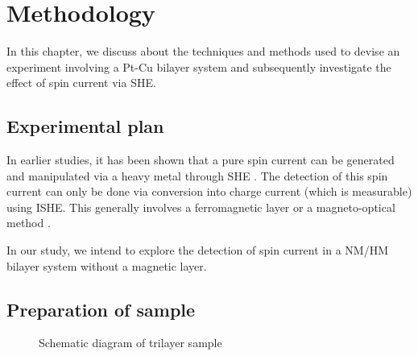\chapter{Methodology}

\label{chapter4}

In this chapter, we discuss about the techniques and methods used to devise an experiment involving a Pt-Cu bilayer system and subsequently investigate the effect of spin current via SHE.

\section{Experimental plan}

In earlier studies, it has been shown that a pure spin current can be generated and manipulated via a heavy metal through SHE \cite{hirsch1999spin,sinova2004universal,zhang2000spin}. The detection of this spin current can only be done via conversion into charge current (which is measurable) using ISHE. This generally involves a ferromagnetic layer or a magneto-optical method \cite{kimura2007room,li2019spin,stamm2017magneto}.

In our study, we intend to explore the detection of spin current in a NM/HM bilayer system without a magnetic layer.

\section{Preparation of sample}

\begin{figure}
    \centering
{}
    \caption{Schematic diagram of trilayer sample}
\end{figure}
